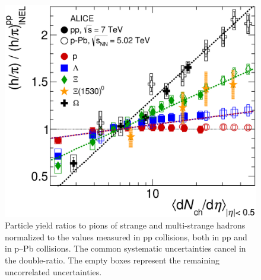 \begin{figure}[htbp]
\begin{center}
\includegraphics[width=10.cm]{./Version1/FigChapter6/Ratio/RatioToPionXiStar}
\caption{ Particle yield ratios to pions of strange and multi-strange hadrons normalized to the values measured in pp collisions, both in pp and in p--Pb collisions. The common systematic uncertainties cancel in the double-ratio. The empty boxes represent the remaining uncorrelated uncertainties. %
}
\label{fig:doubler}
\end{center}
\end{figure}





\newpage
